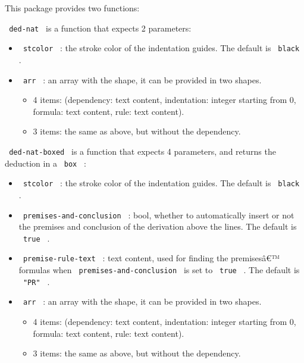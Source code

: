 This package provides two functions:

\texttt{\ ded-nat\ } is a function that expects 2 parameters:

\begin{itemize}
\tightlist
\item
  \texttt{\ stcolor\ } : the stroke color of the indentation guides. The
  default is \texttt{\ black\ } .
\item
  \texttt{\ arr\ } : an array with the shape, it can be provided in two
  shapes.

  \begin{itemize}
  \tightlist
  \item
    4 items: (dependency: text content, indentation: integer starting
    from 0, formula: text content, rule: text content).
  \item
    3 items: the same as above, but without the dependency.
  \end{itemize}
\end{itemize}

\texttt{\ ded-nat-boxed\ } is a function that expects 4 parameters, and
returns the deduction in a \texttt{\ box\ } :

\begin{itemize}
\tightlist
\item
  \texttt{\ stcolor\ } : the stroke color of the indentation guides. The
  default is \texttt{\ black\ } .
\item
  \texttt{\ premises-and-conclusion\ } : bool, whether to automatically
  insert or not the premises and conclusion of the derivation above the
  lines. The default is \texttt{\ true\ } .
\item
  \texttt{\ premise-rule-text\ } : text content, used for finding the
  premisesâ€™ formulas when \texttt{\ premises-and-conclusion\ } is set
  to \texttt{\ true\ } . The default is \texttt{\ "PR"\ } .
\item
  \texttt{\ arr\ } : an array with the shape, it can be provided in two
  shapes.

  \begin{itemize}
  \tightlist
  \item
    4 items: (dependency: text content, indentation: integer starting
    from 0, formula: text content, rule: text content).
  \item
    3 items: the same as above, but without the dependency.
  \end{itemize}
\end{itemize}


